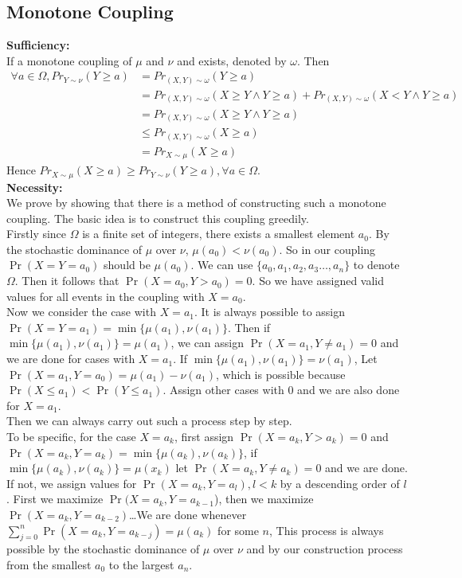 \documentclass[12pt,letterpaper]{article}
\begin{document}
\subsection{Monotone Coupling}
\textbf{Sufficiency:}\\
If a monotone coupling of $\mu$ and $\nu$ and exists, denoted by $\omega$. Then 
\begin{align}
  \forall a\in\Omega, Pr_{Y\sim\nu}(Y\geq a)&=Pr_{(X,Y)\sim\omega}(Y\geq a)\\
  &=Pr_{(X,Y)\sim\omega}(X\geq Y\wedge Y\geq a)+Pr_{(X,Y)\sim\omega}(X < Y\wedge Y\geq a)\\
  &=Pr_{(X,Y)\sim\omega}(X\geq Y\wedge Y\geq a)\\
  &\leq Pr_{(X,Y)\sim\omega}(X\geq a)\\
  &=Pr_{X\sim\mu}(X\geq a)
\end{align}
Hence $Pr_{X\sim\mu}(X\geq a)\geq Pr_{Y\sim\nu}(Y\geq a),\forall a\in\Omega$.\\
\textbf{Necessity:}\\
We prove by showing that there is a method of constructing such a monotone coupling. The basic idea is to construct this coupling greedily.\\
Firstly since $\Omega$ is a finite set of integers, there exists a smallest element $a_0$. By the stochastic dominance of $\mu$ over $\nu$, $\mu(a_0)<\nu(a_0)$. So in our coupling $\Pr(X=Y=a_0)$ should be $\mu(a_0)$. We can use $\{a_0,a_1,a_2,a_3\dots,a_n\}$ to denote $\Omega$. Then it follows that $\Pr(X=a_0,Y>a_0)=0$. So we have assigned valid values for all events in the coupling with $X=a_0$.\\
Now we consider the case with $X=a_1$. It is always possible to assign $\Pr(X=Y=a_1)=\min\{\mu(a_1),\nu(a_1)\}$. Then if $\min\{\mu(a_1),\nu(a_1)\}=\mu(a_1)$, we can assign $\Pr(X=a_1,Y\neq a_1)=0$ and we are done for cases with $X=a_1$. If $\min\{\mu(a_1),\nu(a_1)\}=\nu(a_1)$, Let $\Pr(X=a_1,Y=a_0)=\mu(a_1)-\nu(a_1)$, which is possible because $\Pr(X\leq a_1)<\Pr(Y\leq a_1)$. Assign other cases with $0$ and we are also done for $X=a_1$.\\
Then we can always carry out such a process step by step.\\
To be specific, for the case $X=a_k$, first assign $\Pr(X=a_k,Y>a_k)=0$ and $\Pr(X=a_k,Y=a_k)=\min\{\mu(a_k),\nu(a_k)\}$, if $\min\{\mu(a_k),\nu(a_k)\}=\mu(x_k)$ let $\Pr(X=a_k,Y\neq a_k)=0$ and we are done. If not, we assign values for $\Pr(X=a_k,Y=a_l),l<k$ by a descending order of $l$. First we maximize $\Pr(X=a_k,Y=a_{k-1}$), then we maximize $\Pr(X=a_k,Y=a_{k-2})$\dots We are done whenever $\sum_{j=0}^{n}\Pr(X=a_k,Y=a_{k-j})=\mu(a_k)$ for some $n$, This process is always possible by the stochastic dominance of $\mu$ over $\nu$ and by our construction process from the smallest $a_0$ to the largest $a_n$.
\end{document}
